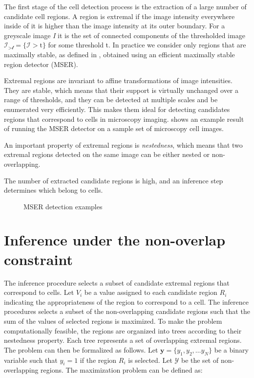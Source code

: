 	The first stage of the cell detection process is the extraction of a large number of candidate cell regions. A region is extremal if the image intensity everywhere inside of it is higher than the image intensity at its outer boundary. For a greyscale image \textit{I} it is the set of connected components of the thresholded image $\mathcal{I_{>\text{t}}} = \{\mathcal{I} > \text{t}\}$ for some threshold t. In practice we consider only regions that are maximally stable, as defined in \cite{matas04}, obtained using an efficient maximally stable region detector (MSER).
	
	Extremal regions are invariant to affine transformations of image intensities. They are stable, which means that their support is virtually unchanged over a range of thresholds, and they can be detected at multiple scales and be enumerated very efficiently. This makes them ideal for detecting candidates regions that correspond to cells in microscopy imaging.  shows an example result of running the MSER detector on a sample set of microscopy cell images.
	
	An important property of extremal regions is \textit{nestedness}, which means that two extremal regions detected on the same image can be either nested or non-overlapping.
	
	The number of extracted candidate regions is high, and an inference step determines which belong to cells.
	
	\begin{figure}[h]
		\centering
		\caption{MSER detection examples}
		\label{fig:mserexamplesoncells}
	\end{figure}
	
	\section{Inference under the non-overlap constraint \statusfirstdraft}
	\label{sec:detector_inference}
	
	The inference procedure selects a subset of candidate extremal regions that correspond to cells. Let $V_i$ be a value assigned to each candidate region $R_i$ indicating the appropriateness of the region to correspond to a cell. The inference procedures selects a subset of the non-overlapping candidate regions such that the sum of the values of selected regions is maximized. To make the problem computationally feasible, the regions are organized into trees according to their nestedness property. Each tree represents a set of overlapping extremal regions. The problem can then be formalized as follows. Let $\textbf{y} = \{y_1, y_2, \dots y_N\}$ be a binary variable such that $y_i = 1$ if the region $R_i$ is selected. Let $\mathcal{Y}$ be the set of non-overlapping regions. The maximization problem can be defined as:
	
